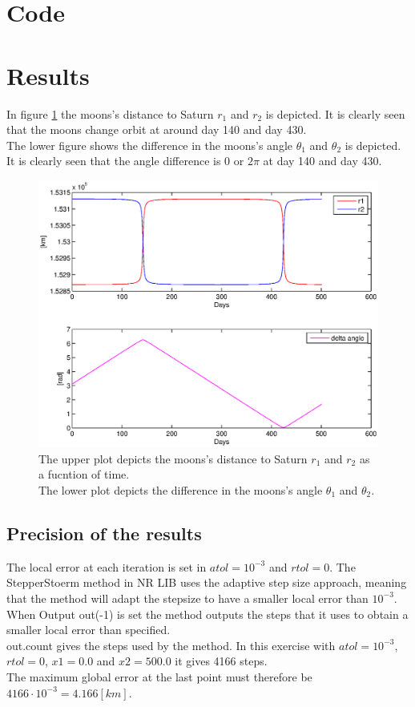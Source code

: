 \section{Code}

\section{Results}

In figure \ref{fig:} the moons's distance to Saturn $r_1$ and $r_2$ is depicted. It is clearly seen that the moons change orbit at around day 140 and day 430. \\
The lower figure shows the difference in the moons's angle $\theta_1$ and $\theta_2$ is depicted. It is clearly seen that the angle difference is $0$ or $2\pi$ at day 140 and day 430. 

\begin{figure}[h!]
\centering
\includegraphics[width=1\textwidth]{./graphics/subplot.eps}
\caption[tekst i indholdsfortegnelsen]{The upper plot depicts the moons's distance to Saturn $r_1$ and $r_2$ as a fucntion of time.\\
The lower plot depicts the difference in the moons's angle $\theta_1$ and $\theta_2$.}
\label{fig:}
\end{figure}

\subsection{Precision of the results}
The local error at each iteration is set in $atol = 10^{-3}$ and $rtol = 0$. The StepperStoerm method in NR LIB uses the adaptive step size approach, meaning that the method will adapt the stepsize to have a smaller local error than $10^{-3}$.
When Output out(-1) is set the method outputs the steps that it uses to obtain a smaller local error than specified. \\
out.count gives the steps used by the method. In this exercise with $atol = 10^{-3}$, $rtol = 0$, $x1=0.0$ and $x2=500.0$ it gives 4166 steps.\\
The maximum global error at the last point must therefore be \\
$4166 \cdot 10^{-3} = 4.166  [km]$.

